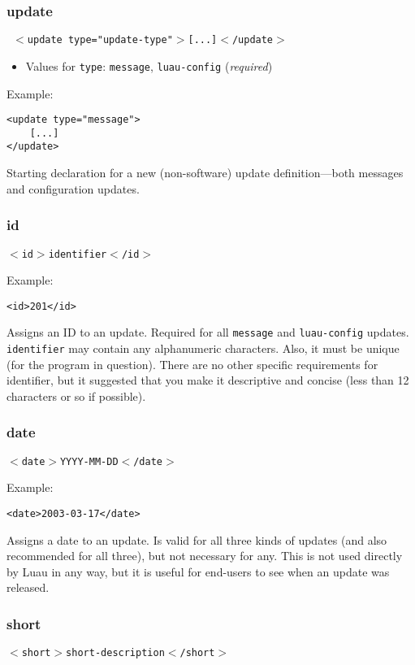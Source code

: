 \documentclass{report}
\begin{document}
\subsubsection{update}
\texttt{
$<$update type="update-type"$>$[...]$<$/update$>$
}
\begin{itemize}
\item Values for \texttt{type}:  \texttt{message}, \texttt{luau-config} (\emph{required})
\end{itemize}

Example: 

\begin{verbatim}
<update type="message">
    [...]
</update>
\end{verbatim}

Starting declaration for a new (non-software) update definition---both messages and configuration updates.

\subsubsection{id}
\texttt{$<$id$>$identifier$<$/id$>$}

Example:

\begin{verbatim}
<id>201</id>
\end{verbatim}

Assigns an ID to an update.  Required for all \texttt{message} and \texttt{luau-config} updates.  \texttt{identifier} may contain any alphanumeric characters.  Also, it must be unique (for the program in question).  There are no other specific requirements for identifier, but it suggested that you make it descriptive and concise (less than 12 characters or so if possible).

\subsubsection{date}
\texttt{$<$date$>$YYYY-MM-DD$<$/date$>$}

Example:

\begin{verbatim}
<date>2003-03-17</date>
\end{verbatim}

Assigns a date to an update.  Is valid for all three kinds of updates (and also recommended for all three), but not necessary for any.  This is not used directly by Luau in any way, but it is useful for end-users to see when an update was released.

\subsubsection{short}
\texttt{$<$short$>$short-description$<$/short$>$}
\end{document}
